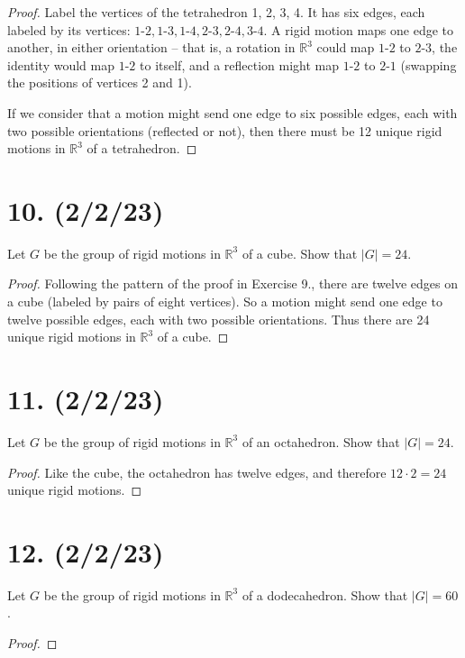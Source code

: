 \documentclass{article}
\begin{document}
\begin{proof}
    Label the vertices of the tetrahedron 1, 2, 3, 4. It has six edges, each labeled by its vertices: $1\textrm{-}2, 1\textrm{-}3, 1\textrm{-}4, 2\textrm{-}3, 2\textrm{-}4, 3\textrm{-}4$. A rigid motion maps one edge to another, in either orientation -- that is, a rotation in $\mathbb{R}^3$ could map $1\textrm{-}2$ to $2\textrm{-}3$, the identity would map $1\textrm{-}2$ to itself, and a reflection might map $1\textrm{-}2$ to $2\textrm{-}1$ (swapping the positions of vertices 2 and 1).

    If we consider that a motion might send one edge to six possible edges, each with two possible orientations (reflected or not), then there must be 12 unique rigid motions in $\mathbb{R}^3$ of a tetrahedron.
\end{proof}

\section*{10. (2/2/23)}

Let $G$ be the group of rigid motions in $\mathbb{R}^3$ of a cube. Show that $|G| = 24$.

\begin{proof}
    Following the pattern of the proof in Exercise 9., there are twelve edges on a cube (labeled by pairs of eight vertices). So a motion might send one edge to twelve possible edges, each with two possible orientations. Thus there are 24 unique rigid motions in $\mathbb{R}^3$ of a cube.
\end{proof}

\section*{11. (2/2/23)}

Let $G$ be the group of rigid motions in $\mathbb{R}^3$ of an octahedron. Show that $|G| = 24$.

\begin{proof}
    Like the cube, the octahedron has twelve edges, and therefore $12 \cdot 2 = 24$ unique rigid motions.
\end{proof}

\section*{12. (2/2/23)}

Let $G$ be the group of rigid motions in $\mathbb{R}^3$ of a dodecahedron. Show that $|G| = 60$.

\begin{proof}
\end{proof}
\end{document}
